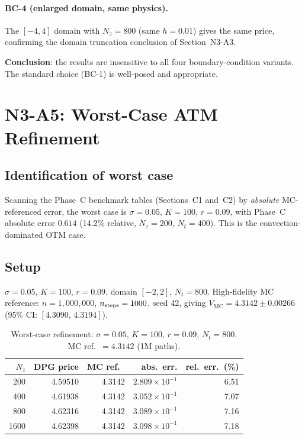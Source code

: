 \documentclass[11pt,a4paper]{article}
\newcommand{\Nz}{N_z}
\newcommand{\Nt}{N_t}
\newcommand{\MC}{\mathrm{MC}}
\begin{document}
\paragraph{BC-4 (enlarged domain, same physics).}
The $[-4,4]$ domain with $\Nz = 800$ (same $h = 0.01$) gives the same
price, confirming the domain truncation conclusion of Section~N3-A3.

\textbf{Conclusion}: the results are insensitive to all four
boundary-condition variants.  The standard choice (BC-1) is well-posed
and appropriate.

\section{N3-A5: Worst-Case ATM Refinement}

\subsection{Identification of worst case}

Scanning the Phase~C benchmark tables (Sections~C1 and~C2) by
\emph{absolute} MC-referenced error, the worst case is
$\sigma = 0.05$, $K = 100$, $r = 0.09$, with Phase~C absolute
error $0.614$ (14.2\% relative, $\Nz = 200$, $\Nt = 400$).
This is the convection-dominated OTM case.

\subsection{Setup}

$\sigma = 0.05$, $K = 100$, $r = 0.09$, domain $[-2, 2]$, $\Nt = 800$.
High-fidelity MC reference: $n = 1{,}000{,}000$, $n_{\rm steps} = 1000$,
seed 42, giving $V_{\MC} = 4.3142 \pm 0.00266$ (95\% CI:
$[4.3090,\, 4.3194]$).

\begin{table}[htbp]
\centering
\caption{Worst-case refinement: $\sigma = 0.05$, $K = 100$, $r = 0.09$,
         $\Nt = 800$.  MC ref.\ $= 4.3142$ (1M paths).}
\label{tab:worst}
\begin{tabular}{rrrrr}
\toprule
$\Nz$ & DPG price & MC ref.\ & abs.\ err. & rel.\ err.\ (\%) \\
\midrule
  200 & 4.59510 & 4.3142 & $2.809\times10^{-1}$ & 6.51 \\
  400 & 4.61938 & 4.3142 & $3.052\times10^{-1}$ & 7.07 \\
  800 & 4.62316 & 4.3142 & $3.089\times10^{-1}$ & 7.16 \\
 1600 & 4.62398 & 4.3142 & $3.098\times10^{-1}$ & 7.18 \\
\bottomrule
\end{tabular}
\end{table}
\end{document}
